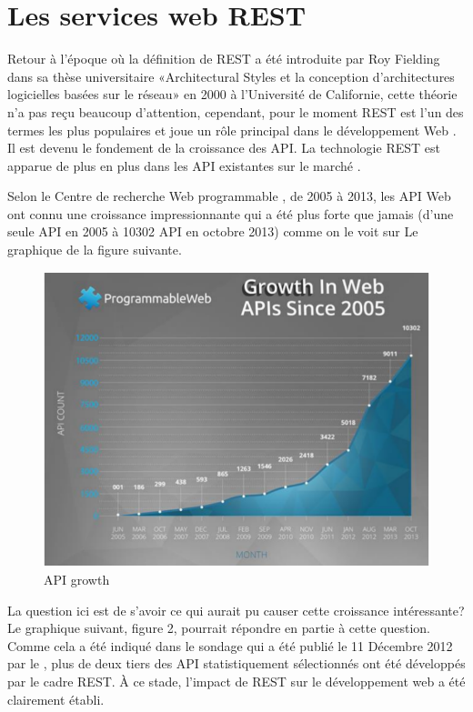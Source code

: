 \chapter{Les services web REST}

Retour à l'époque où la définition de REST a été introduite par Roy Fielding dans sa thèse universitaire «Architectural Styles et la conception d'architectures logicielles basées sur le réseau» en 2000 à l'Université de Californie, cette théorie n'a pas reçu beaucoup d'attention, cependant, pour le moment REST est l'un des termes les plus populaires et joue un rôle principal dans le développement Web \cite{13}. Il est devenu le fondement de la croissance des API. La technologie REST est apparue de plus en plus dans les API existantes sur le marché \cite{15}.

Selon le Centre de recherche Web programmable \cite{15}, de 2005 à 2013, les API Web ont connu une croissance impressionnante qui a été plus forte que jamais (d'une seule API en 2005 à 10302 API en octobre 2013) comme on le voit sur Le graphique de la figure suivante.
\begin{figure}[! ht ]
			\centering
			\includegraphics[scale=.4]{./images/api_growth.png}
			\caption {API growth}
		\end{figure}
		
La question ici est de s'avoir ce qui aurait pu causer cette croissance intéressante? Le graphique suivant, figure 2, pourrait répondre en partie à cette question. Comme cela a été indiqué dans le sondage qui a été publié le 11 Décembre 2012 par le \cite{13}, plus de deux tiers des API statistiquement sélectionnés ont été développés par le cadre REST. À ce stade, l'impact de REST sur le développement web a été clairement établi.

